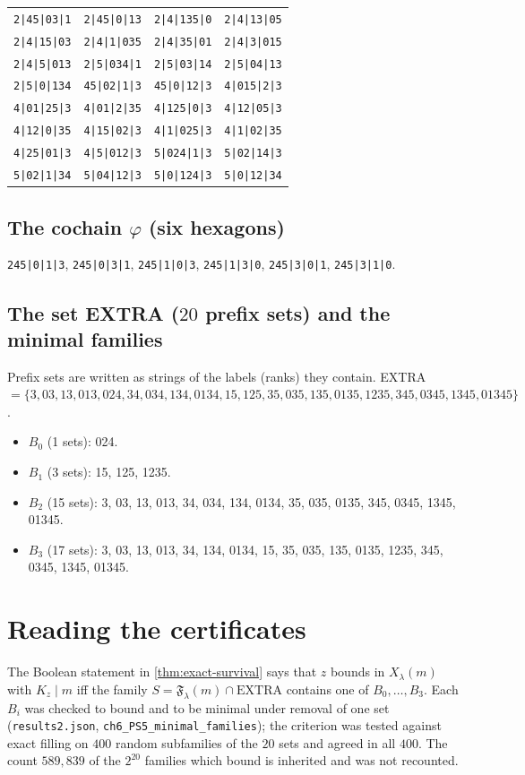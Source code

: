 \begin{center}
\begin{tabular}{llll}
\texttt{2|45|03|1} & \texttt{2|45|0|13} & \texttt{2|4|135|0} & \texttt{2|4|13|05} \\
\texttt{2|4|15|03} & \texttt{2|4|1|035} & \texttt{2|4|35|01} & \texttt{2|4|3|015} \\
\texttt{2|4|5|013} & \texttt{2|5|034|1} & \texttt{2|5|03|14} & \texttt{2|5|04|13} \\
\texttt{2|5|0|134} & \texttt{45|02|1|3} & \texttt{45|0|12|3} & \texttt{4|015|2|3} \\
\texttt{4|01|25|3} & \texttt{4|01|2|35} & \texttt{4|125|0|3} & \texttt{4|12|05|3} \\
\texttt{4|12|0|35} & \texttt{4|15|02|3} & \texttt{4|1|025|3} & \texttt{4|1|02|35} \\
\texttt{4|25|01|3} & \texttt{4|5|012|3} & \texttt{5|024|1|3} & \texttt{5|02|14|3} \\
\texttt{5|02|1|34} & \texttt{5|04|12|3} & \texttt{5|0|124|3} & \texttt{5|0|12|34} \\
\end{tabular}\end{center}

\subsection*{The cochain $\varphi$ (six hexagons)}
\texttt{245|0|1|3}, \texttt{245|0|3|1}, \texttt{245|1|0|3}, \texttt{245|1|3|0}, \texttt{245|3|0|1}, \texttt{245|3|1|0}.

\subsection*{The set EXTRA ($20$ prefix sets) and the minimal families}
Prefix sets are written as strings of the labels (ranks) they contain. EXTRA $=\{3, 03, 13, 013, 024, 34, 034, 134, 0134, 15, 125, 35, 035, 135, 0135, 1235, 345, 0345, 1345, 01345\}$.
\begin{itemize}
\item $B_0$ (1 sets): 024.
\item $B_1$ (3 sets): 15, 125, 1235.
\item $B_2$ (15 sets): 3, 03, 13, 013, 34, 034, 134, 0134, 35, 035, 0135, 345, 0345, 1345, 01345.
\item $B_3$ (17 sets): 3, 03, 13, 013, 34, 134, 0134, 15, 35, 035, 135, 0135, 1235, 345, 0345, 1345, 01345.
\end{itemize}


\section{Reading the certificates}
The Boolean statement in \cref{thm:exact-survival} says that $z$ bounds in $X_\lambda(m)$ with $K_z\mid m$ iff the family $S=\mathfrak F_\lambda(m)\cap\mathrm{EXTRA}$ contains one of $B_0,\dots,B_3$. Each $B_i$ was checked to bound and to be minimal under removal of one set (\texttt{results2.json}, \texttt{ch6\_PS5\_minimal\_families}); the criterion was tested against exact filling on $400$ random subfamilies of the $20$ sets and agreed in all $400$. The count $589{,}839$ of the $2^{20}$ families which bound is inherited and was not recounted.

